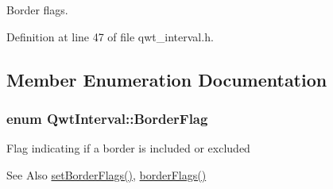 Border flags. 



Definition at line 47 of file qwt\-\_\-interval.\-h.



\subsection{Member Enumeration Documentation}
\hypertarget{class_qwt_interval_a3a4b4e49495108c660fc07a62af7ac54}{
\subsubsection[{Border\-Flag}]{\setlength{\rightskip}{0pt plus 5cm}enum {\bf Qwt\-Interval\-::\-Border\-Flag}}}\label{class_qwt_interval_a3a4b4e49495108c660fc07a62af7ac54}
Flag indicating if a border is included or excluded \begin{DoxySeeAlso}{See Also}
\hyperlink{class_qwt_interval_ad1bce23251519f0d44937413f8547dc5}{set\-Border\-Flags()}, \hyperlink{class_qwt_interval_a885306d2a8538fe37c1446853aa18018}{border\-Flags()} 
\end{DoxySeeAlso}
